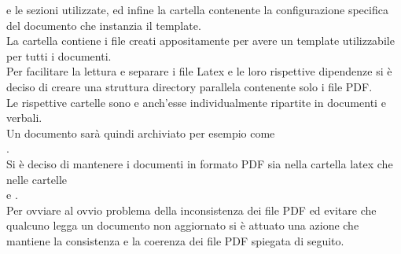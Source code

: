 e le sezioni utilizzate, ed infine la cartella  contenente la configurazione specifica del documento che instanzia il template.\\
La cartella  contiene i file creati appositamente per avere un template utilizzabile per tutti i documenti.\\
Per facilitare la lettura e separare i file Latex e le loro rispettive dipendenze si è deciso di creare una struttura directory
parallela contenente solo i file PDF.\\
Le rispettive cartelle sono  e  anch'esse individualmente ripartite in documenti e verbali.\\
Un documento sarà quindi archiviato per esempio come\\
.\\
Si è deciso di mantenere i documenti in formato PDF sia nella cartella latex che nelle cartelle\\
 e .\\
Per ovviare al ovvio problema della inconsistenza dei file PDF ed evitare che qualcuno legga un documento non aggiornato si è attuato una azione che 
mantiene la consistenza e la coerenza dei file PDF spiegata di seguito.\\

